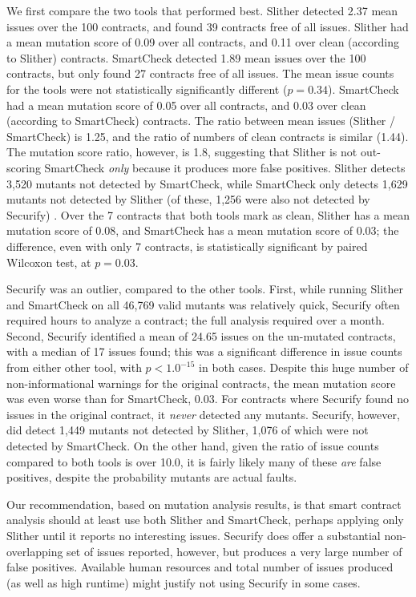 We first compare the two tools that performed best.  Slither detected 2.37 mean issues over the 100 contracts, and found 39 contracts free of all issues.  Slither had a mean mutation score of 0.09 over all contracts, and 0.11 over clean (according to Slither) contracts.  SmartCheck detected 1.89 mean issues over the 100 contracts, but only found 27 contracts free of all issues.  The mean issue counts for the tools were not statistically significantly different ($p=0.34$).  SmartCheck had a mean mutation score of 0.05 over all contracts, and 0.03 over clean (according to SmartCheck) contracts.  The ratio between mean issues (Slither / SmartCheck) is 1.25, and the ratio of numbers of clean contracts is similar (1.44).  The mutation score ratio, however, is 1.8, suggesting that Slither is not out-scoring SmartCheck \emph{only} because it produces more false positives.  Slither detects 3,520 mutants not detected by SmartCheck, while SmartCheck only detects 1,629 mutants not detected by Slither (of these, 1,256 were also not detected by Securify) .  Over the 7 contracts that both tools mark as clean, Slither has a mean mutation score of 0.08, and SmartCheck has a mean mutation score of 0.03; the difference, even with only 7 contracts, is statistically significant by paired Wilcoxon test, at $p=0.03$.

Securify was an outlier, compared to the other tools.  First, while running Slither and SmartCheck on all 46,769 valid mutants was relatively quick, Securify often required hours to analyze a contract; the full analysis required over a month.  Second, Securify identified a mean of 24.65 issues on the un-mutated contracts, with a median of 17 issues found; this was a significant difference in issue counts from either other tool, with $p<1.0^{-15}$ in both cases.  Despite this huge number of non-informational warnings for the original contracts, the mean mutation score was even worse than for SmartCheck, 0.03.  For contracts where Securify found no issues in the original contract, it \emph{never} detected any mutants. Securify, however, did detect 1,449 mutants not detected by Slither, 1,076 of which were not detected by SmartCheck.  On the other hand, given the ratio of issue counts compared to both tools is over 10.0, it is fairly likely many of these \emph{are} false positives, despite the probability mutants are actual faults.

Our recommendation, based on mutation analysis results, is that smart contract analysis should at least use both Slither and SmartCheck, perhaps applying only Slither until it reports no interesting issues.  Securify does offer a substantial non-overlapping set of issues reported, however, but produces a very large number of false positives.  Available human resources and total number of issues produced (as well as high runtime) might justify not using Securify in some cases.

